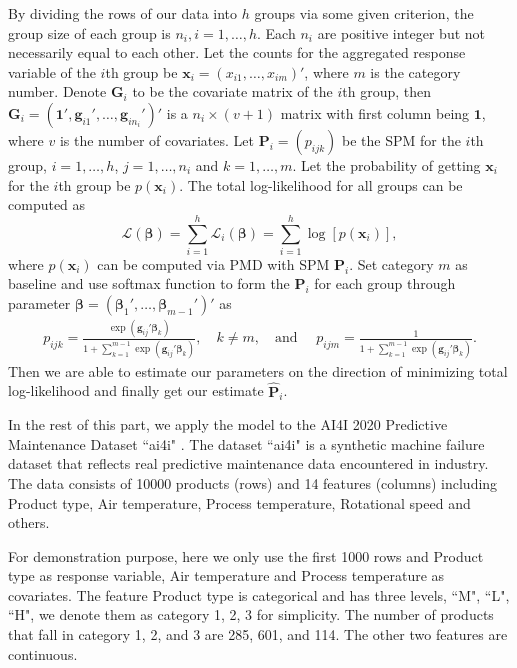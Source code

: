 \documentclass[12pt]{article}
\newcommand{\loglik}{\mathcal{L}}
\newcommand{\onevec}{{\boldsymbol{1}}}
\newcommand{\betavec}{{\boldsymbol{\beta}}}
\newcommand{\Pmat}{\mathbf{P}}
\newcommand{\Gmat}{\mathbf{G}}
\newcommand{\PMD}{\textrm{PMD}}
\newcommand{\wh}{\widehat}
\newcommand{\xvec}{\boldsymbol{x}}
\newcommand{\gvec}{\boldsymbol{g}}
\begin{document}
By dividing the rows of our data into $h$ groups via some given criterion, the group size of each group is $n_i,i=1,\dots,h$. Each $n_i$ are positive integer but not necessarily equal to each other. Let the counts for the aggregated response variable of the $i$th group be
$\xvec_i = (x_{i1}, \dots,x_{im})'$, where $m$ is the category number. Denote $\Gmat_i$ to be the covariate matrix of the $i$th group, then $\Gmat_i = (\onevec', \gvec_{i 1}',\dots,\gvec_{i n_i}')'$ is a $n_i \times (v+1)$ matrix with first column being $\onevec$, where $v$ is the number of covariates. Let $\Pmat_i = (p_{ijk})$ be the SPM for the $i$th group, $i = 1, \dots, h$, $j = 1,\dots ,n_i$ and $k = 1,\dots, m$. Let the probability of getting $\xvec_i$ for the $i$th group be $p(\xvec_i)$. The total log-likelihood for all groups can be computed as
\begin{equation*}
\loglik(\betavec) = \sum_{i=1}^{h}\loglik_i(\betavec) = \sum_{i=1}^{h}\log[p(\xvec_i)],
\end{equation*}
where $p(\xvec_i)$ can be computed via $\PMD$ with SPM $\Pmat_i$. Set category $m$ as baseline and use softmax function to form the $\Pmat_i$ for each group through parameter $\betavec = (\betavec_1', \dots, \betavec_{m-1}')'$ as
\begin{align*}
    p_{i j k} = \frac{\exp{\left(\gvec_{ij}' \betavec_{k}\right)}}{1 + \sum_{k=1}^{m-1}\exp{\left( \gvec_{ij}' \betavec_{k} \right)}},
    \quad k \neq m, \quad \text{and } \quad
    p_{i j m} = \frac{1}{1 + \sum_{k=1}^{m-1}\exp{\left( \gvec_{ij}' \betavec_{k} \right)}}.
\end{align*}
Then we are able to estimate our parameters on the direction of minimizing total log-likelihood and finally get our estimate $\wh{\Pmat}_i$.

In the rest of this part, we apply the model to the
AI4I 2020 Predictive Maintenance Dataset ``ai4i"  \cite{Dua:2019}. The dataset ``ai4i" is a synthetic machine failure dataset that reflects real predictive maintenance data encountered in industry. The data consists of 10000 products (rows) and 14 features (columns) including Product type, Air temperature, Process temperature, Rotational speed and others.

For demonstration purpose, here we only use the first 1000 rows and Product type as response variable, Air temperature and Process temperature as covariates. The feature Product type is categorical and has three levels, ``M", ``L", ``H", we denote them as category 1, 2, 3 for simplicity. The number of products that fall in category 1, 2, and 3 are 285, 601, and 114. The other two features are continuous.
\end{document}
